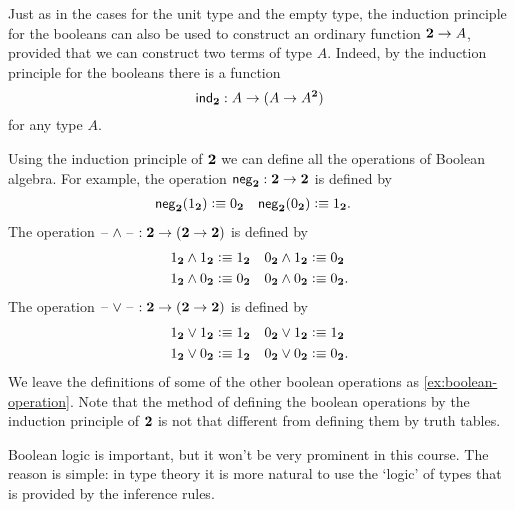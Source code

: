 Just as in the cases for the unit type and the empty type, the induction principle for the booleans can also be used to construct an ordinary function $\bool\to A$, provided that we can construct two terms of type $A$. Indeed, by the induction principle for the booleans there is a function
\begin{equation*}
  \indbool : A \to (A\to A^\bool)
\end{equation*}
for any type $A$.

\begin{eg}\label{eg:boolean-ops}
  Using the induction principle of $\bool$ we can define all the operations of Boolean algebra. For example, the  operation $\negbool : \bool \to \bool$ is defined by
  \begin{align*}
    \negbool(\btrue) & \defeq \bfalse & \negbool(\bfalse) & \defeq \btrue.
  \end{align*}
  The  operation $\blank\land\blank : \bool \to (\bool\to \bool)$ is defined by
  \begin{align*}
    \btrue\land\btrue & \defeq \btrue & \bfalse\land\btrue & \defeq \bfalse \\
    \btrue\land\bfalse & \defeq \bfalse & \bfalse\land\bfalse & \defeq \bfalse.
  \end{align*}
  The  operation $\blank\lor\blank : \bool \to (\bool\to \bool)$ is defined by
  \begin{align*}
    \btrue\lor\btrue & \defeq \btrue & \bfalse\lor\btrue & \defeq \btrue \\
    \btrue\lor\bfalse & \defeq \btrue & \bfalse\lor\bfalse & \defeq \bfalse.
  \end{align*}  
  We leave the definitions of some of the other boolean operations as \cref{ex:boolean-operation}. Note that the method of defining the boolean operations by the induction principle of $\bool$ is not that different from defining them by truth tables.

  Boolean logic is important, but it won't be very prominent in this course. The reason is simple: in type theory it is more natural to use the `logic' of types that is provided by the inference rules.
\end{eg}

